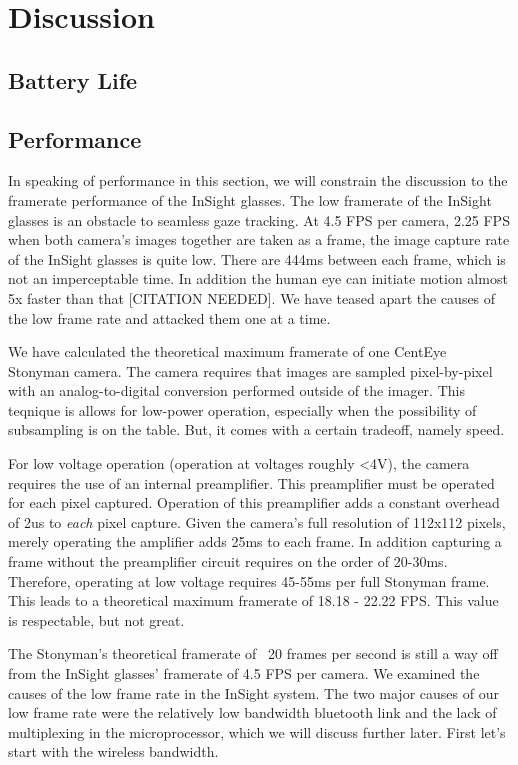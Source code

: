 \section{Discussion}
\label{sec:disc}
\subsection{Battery Life}

\subsection{Performance}

In speaking of performance in this section, we will constrain the discussion to the framerate performance of the InSight glasses.  The low framerate of the InSight glasses is an obstacle to seamless gaze tracking.  At 4.5 FPS per camera, 2.25 FPS when both camera's images together are taken as a frame, the image capture rate of the InSight glasses is quite low.  There are 444ms between each frame, which is not an imperceptable time.  In addition the human eye can initiate motion almost 5x faster than that [CITATION NEEDED].  We have teased apart the causes of the low frame rate and attacked them one at a time.

We have calculated the theoretical maximum framerate of one CentEye Stonyman camera.  The camera requires that images are sampled pixel-by-pixel with an analog-to-digital conversion performed outside of the imager.  This teqnique is allows for low-power operation, especially when the possibility of subsampling is on the table.  But, it comes with a certain tradeoff, namely speed.

For low voltage operation (operation at voltages roughly <4V), the camera requires the use of an internal preamplifier.  This preamplifier must be operated for each pixel captured.  Operation of this preamplifier adds a constant overhead of 2us to \textit{each} pixel capture.  Given the camera's full resolution of 112x112 pixels, merely operating the amplifier adds 25ms to each frame.  In addition capturing a frame without the preamplifier circuit requires on the order of 20-30ms.  Therefore, operating at low voltage requires 45-55ms per full Stonyman frame.  This leads to a theoretical maximum framerate of 18.18 - 22.22 FPS.  This value is respectable, but not great.

The Stonyman's theoretical framerate of ~20 frames per second is still a way off from the InSight glasses' framerate of 4.5 FPS per camera.  We examined the causes of the low frame rate in the InSight system.  The two major causes of our low frame rate were the relatively low bandwidth bluetooth link and the lack of multiplexing in the microprocessor, which we will discuss further later.  First let's start with the wireless bandwidth.

